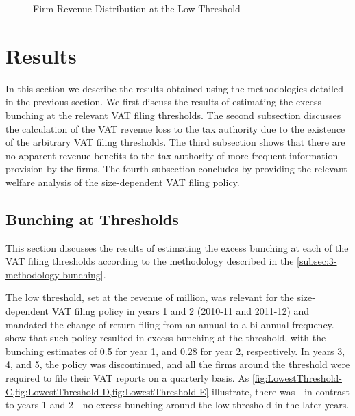\begin{figure}[ht!]
{    \label{fig:LowestThreshold-E}
  }
  \caption{Firm Revenue Distribution at the Low Threshold}
  \label{fig:LowestThreshold}
\end{figure}


\section{Results}
\label{sec:3-results}
In this section we describe the results obtained using the methodologies detailed in the previous section. We first discuss the results of estimating the excess bunching at the relevant VAT filing thresholds. The second subsection discusses the calculation of the VAT revenue loss to the tax authority due to the existence of the arbitrary VAT filing thresholds. The third subsection shows that there are no apparent revenue benefits to the tax authority of more frequent information provision by the firms. The fourth subsection concludes by providing the relevant welfare analysis of the size-dependent VAT filing policy.

\subsection{Bunching at Thresholds}
\label{subsec:3-results-bunching}
This section discusses the results of estimating the excess bunching at each of the VAT filing thresholds according to the methodology described in the \cref{subsec:3-methodology-bunching}.

The low threshold, set at the revenue of  million, was relevant for the size-dependent VAT filing policy in years 1 and 2 (2010-11 and 2011-12) and mandated the change of return filing from an annual to a bi-annual frequency.  show that such policy resulted in excess bunching at the threshold, with the bunching estimates of 0.5 for year 1, and 0.28 for year 2, respectively. In years 3, 4, and 5, the policy was discontinued, and all the firms around the threshold were required to file their VAT reports on a quarterly basis. As \cref{fig:LowestThreshold-C,fig:LowestThreshold-D,fig:LowestThreshold-E} illustrate, there was - in contrast to years 1 and 2 - no excess bunching around the low threshold in the later years.


